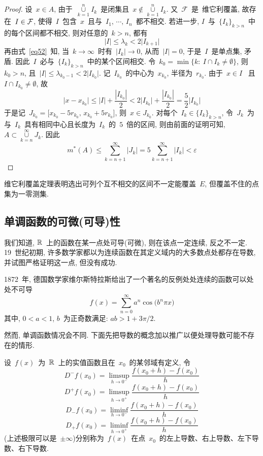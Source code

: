 \begin{proof}
设~$x \in A$, 由于~$\mathop{\cup}\limits_{k=1}^n I_k$~是闭集且~$x \notin \mathop{\cup}\limits_{k=1}^n I_k
$. 又~$\mathcal{F}$~是~维它利覆盖, 故存在~$I \in \mathcal{F}$, 使得~$I$~包含~$x$~且与~$I_1,\,\cdots,\,I_n$~都不相交. 若进一步, $I$~与~$\{I_k\}_{k > n}$~中的每个区间都不相交, 则对任意的~$k > n$, 都有
\[
|I| \leqslant \lambda_k < 2\big|I_{k+1}\big|
\]
再由式~\eqref{eq52}~知, 当~$k \to \infty$~时有~$|I_k| \to 0$, 从而~$|I|=0$, 于是~$I$~是单点集, 矛盾. 因此~$I$~必与~$\{I_k\}_{k > n}$~中的某个区间相交.
令~$k_0 = \min\{k:\: I \cap I_k \neq \emptyset\}$, 则~$k_0 > n$, 且~$|I| \leqslant \lambda_{k_0-1} < 2 \big|I_{k_0}\big|$. 记~$I_{k_0}$~的中心为~$x_{k_0}$, 半径为~$r_{k_0}$. 由于~$x \in I$~
且~$I \cap I_{k_0} \neq \emptyset$, 故
\[
\big|x-x_{k_0}\big| \leqslant |I| + \frac{|I_{k_0}|}{2} < 2\big|I_{k_0}\big| + \frac{|I_{k_0}|}{2} = \frac{5}{2}\big|I_{k_0}\big|
\]
于是记~$J_{k_0} = \big[ x_{k_0}-5r_{k_0}, \, x_{k_0}+5r_{k_0} \big]$, 则~$x \in J_{k_0}$.
对每个~$I_k \in \{I_k\}_{k > n}$, 令~$J_k$~为与~$I_k$~具有相同中心且长度为~$I_k$~的~$5$~倍的区间, 则由前面的证明可知, $A \subset \mathop{\cup}\limits_{k=n}^\infty J_k$. 因此
\[
m^*(A) \leqslant \sum_{k=n+1}^\infty \big|J_k\big| = 5 \sum_{k=n+1}^\infty \big|I_k\big| < \varepsilon
\]
\end{proof}

\begin{remark}
维它利覆盖定理表明选出可列个互不相交的区间不一定能覆盖~$E$, 但覆盖不住的点集为一零测集.
\end{remark}

\subsection{单调函数的可微(可导)性}

我们知道, $\mathbb{R}$~上的函数在某一点处可导(可微), 则在该点一定连续, 反之不一定. 19~世纪初期, 许多数学家都以为连续函数在其定义域内的大多数点处都存在导数, 并试图严格证明这一点, 但没有成功.

1872~年, 德国数学家维尔斯特拉斯给出了一个著名的反例\raisebox{0.5mm}{-----}处处连续的函数可以处处不可导
\[
f(x) = \sum_{n=0}^\infty a^n \cos\big(b^n \pi x\big)
\]
其中, $0<a<1$, $b$~为正奇数满足: $ab > 1 + 3\pi/2$.

然而, 单调函数情况会不同. 下面先把导数的概念加以推广以便处理导数可能不存在的情形.

\begin{definition}
设~$f(x)$~为~$\mathbb{R}$~上的实值函数且在~$x_0$~的某邻域有定义, 令
\[
D^-f(x_0) = \limsup_{h \to 0^-} \frac{f(x_0 + h) - f(x_0)}{h}
\]
\[
D^+f(x_0) = \limsup_{h \to 0^+} \frac{f(x_0 + h) - f(x_0)}{h}
\]
\[
D_-f(x_0) = \liminf_{h \to 0^-} \frac{f(x_0 + h) - f(x_0)}{h}
\]
\[
D_+f(x_0) = \liminf_{h \to 0^+} \frac{f(x_0 + h) - f(x_0)}{h}
\]
(上述极限可以是~$\pm \infty$)分别称为~$f(x)$~在点~$x_0$~的左上导数、右上导数、左下导数、右下导数.
\end{definition}

